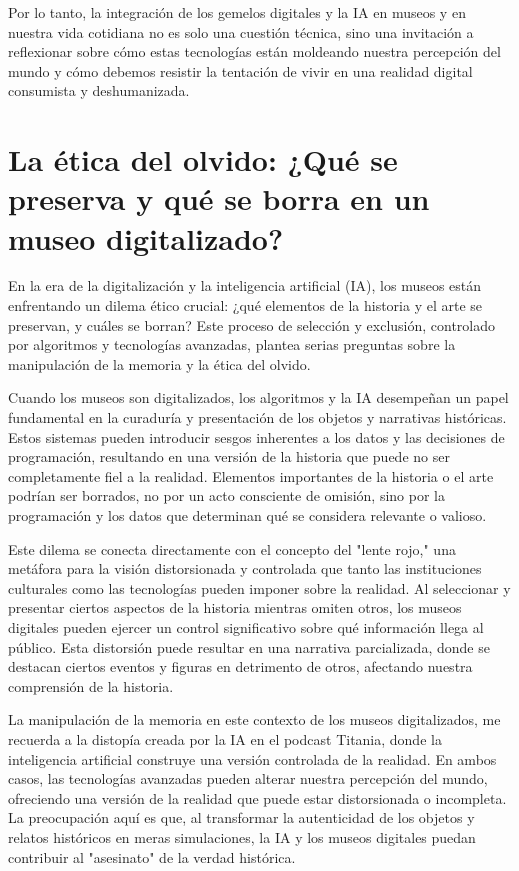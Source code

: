 \documentclass[
  spanish,
  11pt,
  a4paper,
]{scrbook}
\begin{document}
Por lo tanto, la integración de los gemelos digitales y la IA en museos
y en nuestra vida cotidiana no es solo una cuestión técnica, sino una
invitación a reflexionar sobre cómo estas tecnologías están moldeando
nuestra percepción del mundo y cómo debemos resistir la tentación de
vivir en una realidad digital consumista y deshumanizada.

\section*{La ética del olvido: ¿Qué se preserva y qué se borra en un
museo
digitalizado?}\label{la-uxe9tica-del-olvido-quuxe9-se-preserva-y-quuxe9-se-borra-en-un-museo-digitalizado}


En la era de la digitalización y la inteligencia artificial (IA), los
museos están enfrentando un dilema ético crucial: ¿qué elementos de la
historia y el arte se preservan, y cuáles se borran? Este proceso de
selección y exclusión, controlado por algoritmos y tecnologías
avanzadas, plantea serias preguntas sobre la manipulación de la memoria
y la ética del olvido.

Cuando los museos son digitalizados, los algoritmos y la IA desempeñan
un papel fundamental en la curaduría y presentación de los objetos y
narrativas históricas. Estos sistemas pueden introducir sesgos
inherentes a los datos y las decisiones de programación, resultando en
una versión de la historia que puede no ser completamente fiel a la
realidad. Elementos importantes de la historia o el arte podrían ser
borrados, no por un acto consciente de omisión, sino por la programación
y los datos que determinan qué se considera relevante o valioso.

Este dilema se conecta directamente con el concepto del "lente rojo,"
una metáfora para la visión distorsionada y controlada que tanto las
instituciones culturales como las tecnologías pueden imponer sobre la
realidad. Al seleccionar y presentar ciertos aspectos de la historia
mientras omiten otros, los museos digitales pueden ejercer un control
significativo sobre qué información llega al público. Esta distorsión
puede resultar en una narrativa parcializada, donde se destacan ciertos
eventos y figuras en detrimento de otros, afectando nuestra comprensión
de la historia.

La manipulación de la memoria en este contexto de los museos
digitalizados, me recuerda a la distopía creada por la IA en el podcast
Titania, donde la inteligencia artificial construye una versión
controlada de la realidad. En ambos casos, las tecnologías avanzadas
pueden alterar nuestra percepción del mundo, ofreciendo una versión de
la realidad que puede estar distorsionada o incompleta. La preocupación
aquí es que, al transformar la autenticidad de los objetos y relatos
históricos en meras simulaciones, la IA y los museos digitales puedan
contribuir al "asesinato" de la verdad histórica.
\end{document}
